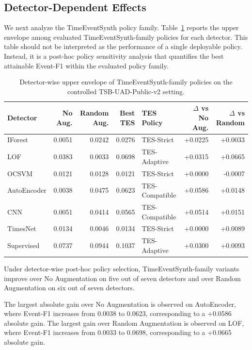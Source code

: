 \documentclass[conference]{IEEEtran}
\begin{document}
\subsection{Detector-Dependent Effects}
\label{sec:detector_dependent_effects}

We next analyze the TimeEventSynth policy family. Table~\ref{tab:policy_upper}
reports the upper envelope among evaluated TimeEventSynth-family policies for each detector. This table should not be interpreted as the performance of a single deployable policy. Instead, it is a post-hoc policy sensitivity analysis that quantifies the best attainable Event-F1 within the evaluated policy family.

\begin{table}[t]
\centering
\caption{Detector-wise upper envelope of TimeEventSynth-family policies on the controlled TSB-UAD-Public-v2 setting.}
\label{tab:policy_upper}
\begin{tabular}{lrrrlrr}
\toprule
Detector & No Aug. & Random Aug. & Best TES & TES Policy & $\Delta$ vs No Aug. & $\Delta$ vs Random \\
\midrule
IForest     & 0.0051 & 0.0242 & 0.0276 & TES-Strict     & +0.0225 & +0.0033 \\
LOF         & 0.0383 & 0.0033 & 0.0698 & TES-Adaptive   & +0.0315 & +0.0665 \\
OCSVM       & 0.0121 & 0.0128 & 0.0121 & TES-Strict     & +0.0000 & -0.0007 \\
AutoEncoder & 0.0038 & 0.0475 & 0.0623 & TES-Compatible & +0.0586 & +0.0148 \\
CNN         & 0.0051 & 0.0414 & 0.0565 & TES-Compatible & +0.0514 & +0.0151 \\
TimesNet    & 0.0134 & 0.0046 & 0.0134 & TES-Strict     & +0.0000 & +0.0089 \\
Supervised  & 0.0737 & 0.0944 & 0.1037 & TES-Adaptive   & +0.0300 & +0.0093 \\
\bottomrule

\end{tabular}
\end{table}

Under detector-wise post-hoc policy selection, TimeEventSynth-family variants
improve over No Augmentation on five out of seven detectors and over Random
Augmentation on six out of seven detectors. 

The largest absolute gain over No Augmentation is observed on AutoEncoder, where Event-F1 increases from 0.0038 to 0.0623, corresponding to a +0.0586 absolute gain. The largest gain over Random Augmentation is observed on LOF, where Event-F1 increases from 0.0033 to 0.0698, corresponding to a +0.0665 absolute gain.
\end{document}
